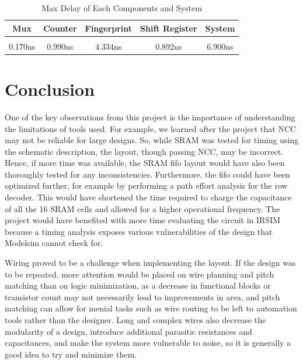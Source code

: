 \documentclass[10pt,journal,compsoc]{IEEEtran}
\begin{document}
    \begin{table}[ht] 
\caption{Max Delay of Each Components and System} %
\centering %
\begin{tabular}{c c c c c} %
\hline\hline %
Mux & Counter & Fingerprint & Shift Register & System\\ [0.5ex] %
\hline %
\\ [0.2 ex]
0.170ns & 0.990ns & 4.334ns & 0.892ns & 6.900ns \\ [1ex] %
\hline %
\end{tabular} 
\label{table:nonlin} %
\end{table} 


\section{Conclusion}
One of the key observations from this project is the importance of understanding the limitations of tools used. For example, we learned after the project that NCC may not be reliable for large designs. So, while SRAM was tested for timing using the schematic description, the layout, though passing NCC, may be incorrect. Hence, if more time was available, the SRAM fifo layout would have also been thoroughly tested for any inconsistencies. Furthermore, the fifo could have been optimized further, for example by performing a path effort analysis for the row decoder. This would have shortened the time required to charge the capacitance of all the 16 SRAM cells and allowed for a higher operational frequency. 
The project would have benefited with more time evaluating the circuit in IRSIM because a timing analysis exposes various vulnerabilities of the design that Modelsim cannot check for. 

Wiring proved to be a challenge when implementing the layout. If the design was to be repeated, more attention would be placed on wire planning and pitch matching than on logic minimization, as a decrease in functional blocks or transistor count may not necessarily lead to improvements in area, and pitch matching can allow for menial tasks such as wire routing to be left to automation tools rather than the designer. Long and complex wires also decrease the modularity of a design, introduce additional parasitic resistances and capacitances, and make the system more vulnerable to noise, so it is generally a good idea to try and minimize them.
\end{document}
